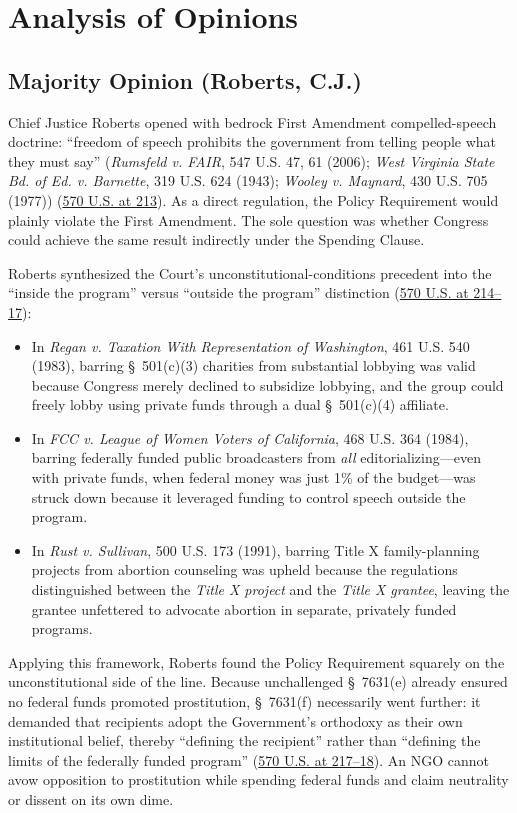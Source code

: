 \documentclass[12pt]{article}
\begin{document}
\section{Analysis of Opinions}

\subsection{Majority Opinion (Roberts, C.J.)}
Chief Justice Roberts opened with bedrock First Amendment compelled-speech doctrine: ``freedom of speech prohibits the government from telling people what they must say'' (\textit{Rumsfeld v. FAIR}, 547 U.S. 47, 61 (2006); \textit{West Virginia State Bd. of Ed. v. Barnette}, 319 U.S. 624 (1943); \textit{Wooley v. Maynard}, 430 U.S. 705 (1977)) (\href{https://supreme.justia.com/cases/federal/us/570/205/}{570 U.S. at 213}). As a direct regulation, the Policy Requirement would plainly violate the First Amendment. The sole question was whether Congress could achieve the same result indirectly under the Spending Clause.

Roberts synthesized the Court's unconstitutional-conditions precedent into the ``inside the program'' versus ``outside the program'' distinction (\href{https://supreme.justia.com/cases/federal/us/570/205/}{570 U.S. at 214--17}):
\begin{itemize}
  \item In \textit{Regan v. Taxation With Representation of Washington}, 461 U.S. 540 (1983), barring \S~501(c)(3) charities from substantial lobbying was valid because Congress merely declined to subsidize lobbying, and the group could freely lobby using private funds through a dual \S~501(c)(4) affiliate.
  \item In \textit{FCC v. League of Women Voters of California}, 468 U.S. 364 (1984), barring federally funded public broadcasters from \emph{all} editorializing---even with private funds, when federal money was just 1\% of the budget---was struck down because it leveraged funding to control speech outside the program.
  \item In \textit{Rust v. Sullivan}, 500 U.S. 173 (1991), barring Title X family-planning projects from abortion counseling was upheld because the regulations distinguished between the \emph{Title X project} and the \emph{Title X grantee}, leaving the grantee unfettered to advocate abortion in separate, privately funded programs.
\end{itemize}
Applying this framework, Roberts found the Policy Requirement squarely on the unconstitutional side of the line. Because unchallenged \S~7631(e) already ensured no federal funds promoted prostitution, \S~7631(f) necessarily went further: it demanded that recipients adopt the Government's orthodoxy as their own institutional belief, thereby ``defining the recipient'' rather than ``defining the limits of the federally funded program'' (\href{https://supreme.justia.com/cases/federal/us/570/205/}{570 U.S. at 217--18}). An NGO cannot avow opposition to prostitution while spending federal funds and claim neutrality or dissent on its own dime.
\end{document}
